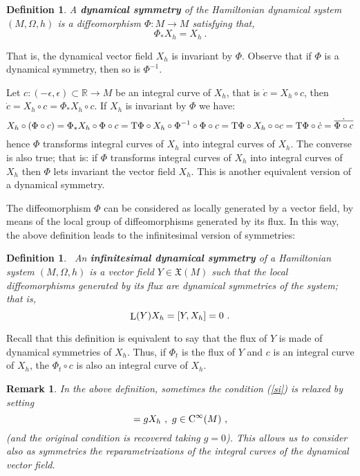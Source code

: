 \documentclass[12pt]{report}
\newtheorem{definition}[teor]{Definition}
\newtheorem{remark}[teor]{Remark}
\def\beq{\begin{equation}}
\def\eeq{\end{equation}}
\def\vf{\mathfrak X}
\def\Real{\mathbb{R}}
\def\Tan{{\rm T}}
\def\Lie{\mathop{\rm L}\nolimits}
\def\Cinfty{{\rm C}^\infty}
\begin{document}
 \begin{definition}
A \textbf{dynamical symmetry} of the Hamiltonian dynamical system $(M,\Omega,h)$
 is a diffeomorphism $\Phi\colon M \to M$ satisfying that,
$$
\Phi_*X_h=X_h \ .
$$
\label{gsdef}
 \end{definition} 
\vspace{-10mm}
That is, the dynamical vector field $X_h$ is invariant by $\Phi$. Observe that if $\Phi$ is a dynamical symmetry, then so is $\Phi^{-1}$.

 
 Let $c\colon(-\epsilon ,\epsilon )\subset\Real\to M$ be an integral curve of $X_h$, that is $\dot{c}=X_h\circ c$, then  $\dot{c}=X_h\circ c=\Phi_*X_h\circ c$. If $X_h$ is invariant by $\Phi$ we have:
 $$
 X_h\circ(\Phi\circ c)=\Phi_*X_h\circ\Phi\circ c=\Tan\Phi\circ X_h\circ\Phi^{-1}\circ\Phi\circ c=\Tan\Phi\circ X_h\circ\circ c=\Tan\Phi\circ\dot{c}=\dot{\overline{\Phi\circ c}}
 $$
 hence $\Phi$ transforms integral curves of $X_h$ into integral curves of $X_h$. The converse is also true; that is: if $\Phi$ transforms integral curves of $X_h$ into integral curves of $X_h$ then $\Phi$ lets invariant the vector field $X_h$. This is another equivalent version of a dynamical symmetry.


The diffeomorphism $\Phi$ can be considered as 
locally generated by a vector field, by means of 
the local group of diffeomorphisms generated by its flux. 
In this way, the above definition leads to the infinitesimal version of symmetries:

 \begin{definition}
\ An \textbf{infinitesimal dynamical symmetry} of a Hamiltonian system 
$(M,\Omega,h)$ is a vector field $Y\in\vf(M)$ such that  
the local diffeomorphisms  generated by its flux
are dynamical symmetries of the system; that is,
\beq
\Lie(Y)X_h=[Y,X_h]=0 \ .
\label{si}
\eeq
\label{gsdefi}
 \end{definition}

Recall that this definition is equivalent to say that the flux of $Y$ is made of dynamical symmetries of $X_h$. Thus, if $\Phi_t$ is the flux of $Y$ and $c$ is an integral curve of $X_h$, the $\Phi_t\circ c$ is also an integral curve of $X_h$.

\begin{remark}{\rm 
In the above definition, sometimes the condition (\ref{si}) is relaxed by setting
\beq
[Y,X_h]=gX_h \ , \ g\in\Cinfty(M) \ ,
\label{si2}
\eeq
(and the original condition is recovered taking $g=0$).
This allows us to consider also as symmetries
the reparametrizations of the integral curves of the
 dynamical vector field.
 }\end{remark}
 
\end{document}
